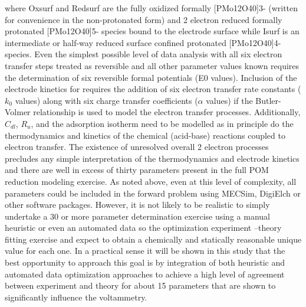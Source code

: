 \documentclass[a4paper, 12pt]{article}
\begin{document}
where Oxsurf and Redsurf are the fully oxidized formally [PMo12O40]3- (written 
for convenience in the non-protonated form) and 2 electron reduced formally 
protonated [PMo12O40]5-  species bound to the electrode surface  while Isurf is 
an intermediate or half-way reduced surface confined  protonated [PMo12O40]4- 
species. Even the simplest possible level of data analysis with all six electron 
transfer steps treated as reversible and all other parameter values known 
requires the determination of six reversible formal potentials (E0 values).  
Inclusion of the electrode kinetics for requires the addition of six electron 
transfer rate constants  ($k_0$  values) along with six charge transfer 
coefficients ($\alpha$ values) if the Butler-Volmer relationship is used to 
model the electron transfer processes. Additionally, $C_{dl}$, $R_u$, and the 
adsorption isotherm need to be modelled as in principle do the thermodynamics 
and kinetics of the chemical (acid-base)   reactions coupled to electron 
transfer. The existence of unresolved overall 2 electron processes precludes any 
simple interpretation of the thermodynamics and electrode kinetics and there are 
well in excess of thirty parameters present in the full POM reduction modeling 
exercise. As noted above, even at this level of complexity, all parameters could 
be included in the forward problem using MECSim, DigiElch or other software 
packages. However, it is not likely to be realistic to simply undertake a 30 or 
more parameter determination exercise using a manual heuristic or even an 
automated data so the optimization experiment –theory fitting exercise and 
expect to obtain a chemically and statically reasonable unique value for each 
one. In a practical sense it will be shown in this study that the best 
opportunity to approach this goal is by integration of both heuristic and 
automated data optimization approaches to achieve   a high level of agreement 
between experiment and theory for about 15 parameters that are shown to 
significantly influence the voltammetry.
\end{document}
